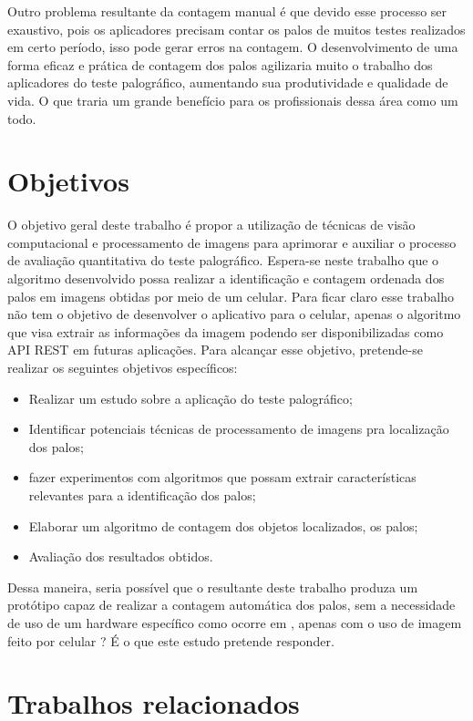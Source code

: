 Outro problema resultante da contagem manual é que devido esse processo ser exaustivo, pois os aplicadores precisam contar os palos de muitos testes realizados em certo período, isso pode gerar erros na contagem. O desenvolvimento de uma forma eficaz e prática de  contagem dos palos agilizaria muito o trabalho dos aplicadores do teste palográfico, aumentando sua produtividade e qualidade de vida. O que traria um grande benefício para os profissionais dessa área como um todo.


\section{Objetivos}
\label{sec:motiv}

O objetivo geral deste trabalho é propor a utilização de técnicas de  visão computacional e processamento de imagens para  aprimorar e auxiliar o processo de avaliação quantitativa do teste palográfico. Espera-se neste trabalho que o algoritmo desenvolvido possa realizar a identificação e contagem ordenada dos palos em imagens obtidas por meio de um celular. Para ficar claro esse trabalho não tem o objetivo de desenvolver o aplicativo para o celular, apenas o algoritmo que visa extrair as informações da imagem podendo  ser disponibilizadas como API REST em futuras aplicações. Para alcançar esse objetivo, pretende-se realizar os seguintes objetivos específicos:
\begin{itemize}
\item Realizar um estudo sobre a aplicação do teste palográfico;
\item Identificar potenciais técnicas de processamento de imagens pra localização dos palos;
\item fazer experimentos com algoritmos que possam extrair características relevantes para a identificação dos palos;
\item Elaborar um algoritmo de contagem dos objetos localizados, os palos;
\item Avaliação dos resultados obtidos.
\end{itemize}

Dessa maneira, seria possível que o  resultante deste trabalho produza um protótipo capaz de realizar a contagem automática dos palos, sem a necessidade de uso de um hardware específico como ocorre em \cite{skip2018}, apenas com o uso de imagem feito por celular ? É o que este estudo pretende responder.



\section{Trabalhos relacionados}
\label{sec:tbrel}

